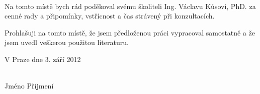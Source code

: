 %
%
%
%
%


\thispagestyle{empty}
\normalsize %
\ \vspace{10mm}

\noindent Na tomto místě bych rád poděkoval svému školiteli Ing. Václavu Kůsovi, PhD. za cenné rady a připomínky, vstřícnost a čas strávený při konzultacích. %


\vspace{0.5cm}

Prohlašuji na tomto místě, že jsem předloženou práci
vypracoval samostatně a že jsem uvedl veškerou použitou
literaturu.

\vspace{1.5cm}

\noindent
\begin{minipage}[b]{5cm}
V Praze dne 3. září 2012
\end{minipage}
\hfill
\begin{minipage}[t]{5cm}
\begin{center}
\dotfill\\
Jméno Příjmení
\end{center}
\end{minipage}

\vspace*{2cm}  

\newpage